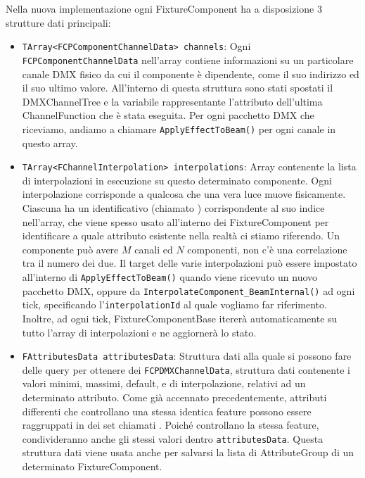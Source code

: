 \documentclass[main.tex]{subfiles}
\begin{document}
Nella nuova implementazione ogni FixtureComponent ha a disposizione 3 strutture dati principali: 
\begin{itemize}
    \item \lstinline{TArray<FCPComponentChannelData> channels}: Ogni \lstinline{FCPComponentChannelData} nell'array contiene informazioni su un particolare canale DMX fisico da cui il componente è dipendente, come il suo indirizzo ed il suo ultimo valore. All'interno di questa struttura sono stati spostati il DMXChannelTree e la variabile rappresentante l'attributo dell'ultima ChannelFunction che è stata eseguita. Per ogni pacchetto DMX che riceviamo, andiamo a chiamare \lstinline{ApplyEffectToBeam()} per ogni canale in questo array.
    \item \lstinline{TArray<FChannelInterpolation> interpolations}: Array contenente la lista di interpolazioni in esecuzione su questo determinato componente. Ogni interpolazione corrisponde a qualcosa che una vera luce muove fisicamente. Ciascuna ha un identificativo (chiamato ) corrispondente al suo indice nell'array, che viene spesso usato all'interno dei FixtureComponent per identificare a quale attributo esistente nella realtà ci stiamo riferendo. Un componente può avere $M$ canali ed $N$ componenti, non c'è una correlazione tra il numero dei due. Il target delle varie interpolazioni può essere impostato all'interno di \lstinline{ApplyEffectToBeam()} quando viene ricevuto un nuovo pacchetto DMX, oppure da \lstinline{InterpolateComponent_BeamInternal()} ad ogni tick, specificando l'\lstinline{interpolationId} al quale vogliamo far riferimento. Inoltre, ad ogni tick, FixtureComponentBase itererà automaticamente su tutto l'array di interpolazioni e ne aggiornerà lo stato.
    \item \lstinline{FAttributesData attributesData}: Struttura dati alla quale si possono fare delle query per ottenere dei \lstinline{FCPDMXChannelData}, struttura dati contenente i valori minimi, massimi, default, e di interpolazione, relativi ad un determinato attributo. Come già accennato precedentemente, attributi differenti che controllano una stessa identica feature possono essere raggruppati in dei set chiamati . Poiché controllano la stessa feature, condivideranno anche gli stessi valori dentro \lstinline{attributesData}. Questa struttura dati viene usata anche per salvarsi la lista di AttributeGroup di un determinato FixtureComponent.
\end{itemize}

\end{document}
